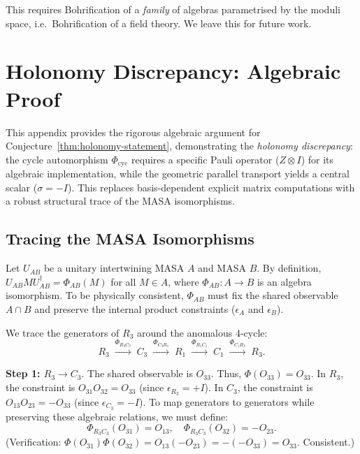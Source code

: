 \documentclass[11pt]{article}
\begin{document}
This requires Bohrification of a \emph{family} of algebras parametrised
by the moduli space, i.e.\ Bohrification of a field theory. We leave
this for future work.

\appendix
\section{Holonomy Discrepancy: Algebraic Proof}
\label{app:transport-proof}

This appendix provides the rigorous algebraic argument for Conjecture~\ref{thm:holonomy-statement},
demonstrating the \emph{holonomy discrepancy}: the cycle automorphism
$\Phi_{\mathrm{cyc}}$ requires a specific Pauli operator ($Z \otimes I$)
for its algebraic implementation, while the geometric parallel transport yields
a central scalar ($\sigma = -I$). This replaces basis-dependent explicit matrix
computations with a robust structural trace of the MASA isomorphisms.

\subsection{Tracing the MASA Isomorphisms}

Let $U_{AB}$ be a unitary intertwining MASA $A$ and MASA $B$. By definition, $U_{AB} M U_{AB}^\dagger = \Phi_{AB}(M)$ for all $M \in A$, where $\Phi_{AB}: A \to B$ is an algebra isomorphism. To be physically consistent, $\Phi_{AB}$ must fix the shared observable $A \cap B$ and preserve the internal product constraints ($\epsilon_A$ and $\epsilon_B$).

We trace the generators of $R_3$ around the anomalous 4-cycle:
\[
  R_3 \;\xrightarrow{\Phi_{R_3 C_3}}\; C_3 \;\xrightarrow{\Phi_{C_3 R_1}}\; R_1 \;\xrightarrow{\Phi_{R_1 C_1}}\; C_1 \;\xrightarrow{\Phi_{C_1 R_3}}\; R_3.
\]

\textbf{Step 1: $R_3 \to C_3$}.
The shared observable is $O_{33}$. Thus, $\Phi(O_{33}) = O_{33}$.
In $R_3$, the constraint is $O_{31}O_{32} = O_{33}$ (since $\epsilon_{R_3} = +I$).
In $C_3$, the constraint is $O_{13}O_{23} = -O_{33}$ (since $\epsilon_{C_3} = -I$).
To map generators to generators while preserving these algebraic relations, we must define:
\[
  \Phi_{R_3 C_3}(O_{31}) = O_{13}, \quad \Phi_{R_3 C_3}(O_{32}) = -O_{23}.
\]
(Verification: $\Phi(O_{31})\Phi(O_{32}) = O_{13}(-O_{23}) = -(-O_{33}) = O_{33}$. Consistent.)
\end{document}
